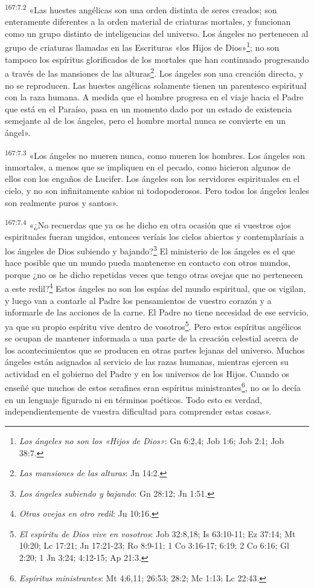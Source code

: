 \par 
\textsuperscript{167:7.2} «Las huestes angélicas son una orden distinta de seres creados; son enteramente diferentes a la orden material de criaturas mortales, y funcionan como un grupo distinto de inteligencias del universo. Los ángeles no pertenecen al grupo de criaturas llamadas en las Escrituras «los Hijos de Dios»\footnote{\textit{Los ángeles no son los «Hijos de Dios»}: Gn 6:2,4; Job 1:6; Job 2:1; Job 38:7.}; no son tampoco los espíritus glorificados de los mortales que han continuado progresando a través de las mansiones de las alturas\footnote{\textit{Las mansiones de las alturas}: Jn 14:2.}. Los ángeles son una creación directa, y no se reproducen. Las huestes angélicas solamente tienen un parentesco espiritual con la raza humana. A medida que el hombre progresa en el viaje hacia el Padre que está en el Paraíso, pasa en un momento dado por un estado de existencia semejante al de los ángeles, pero el hombre mortal nunca se convierte en un ángel».

\par 
\textsuperscript{167:7.3} «Los ángeles no mueren nunca, como mueren los hombres. Los ángeles son inmortales, a menos que se impliquen en el pecado, como hicieron algunos de ellos con los engaños de Lucifer. Los ángeles son los servidores espirituales en el cielo, y no son infinitamente sabios ni todopoderosos. Pero todos los ángeles leales son realmente puros y santos».

\par 
\textsuperscript{167:7.4} «¿No recuerdas que ya os he dicho en otra ocasión que si vuestros ojos espirituales fueran ungidos, entonces veríais los cielos abiertos y contemplaríais a los ángeles de Dios subiendo y bajando?\footnote{\textit{Los ángeles subiendo y bajando}: Gn 28:12; Jn 1:51.} El ministerio de los ángeles es el que hace posible que un mundo pueda mantenerse en contacto con otros mundos, porque ¿no os he dicho repetidas veces que tengo otras ovejas que no pertenecen a este redil?\footnote{\textit{Otras ovejas en otro redil}: Jn 10:16.} Estos ángeles no son los espías del mundo espiritual, que os vigilan, y luego van a contarle al Padre los pensamientos de vuestro corazón y a informarle de las acciones de la carne. El Padre no tiene necesidad de ese servicio, ya que su propio espíritu vive dentro de vosotros\footnote{\textit{El espíritu de Dios vive en vosotros}: Job 32:8,18; Is 63:10-11; Ez 37:14; Mt 10:20; Lc 17:21; Jn 17:21-23; Ro 8:9-11; 1 Co 3:16-17; 6:19; 2 Co 6:16; Gl 2:20; 1 Jn 3:24; 4:12-15; Ap 21:3.}. Pero estos espíritus angélicos se ocupan de mantener informada a una parte de la creación celestial acerca de los acontecimientos que se producen en otras partes lejanas del universo. Muchos ángeles están asignados al servicio de las razas humanas, mientras ejercen su actividad en el gobierno del Padre y en los universos de los Hijos. Cuando os enseñé que muchos de estos serafines eran espíritus ministrantes\footnote{\textit{Espíritus ministrantes}: Mt 4:6,11; 26:53; 28:2; Mc 1:13; Lc 22:43.}, no os lo decía en un lenguaje figurado ni en términos poéticos. Todo esto es verdad, independientemente de vuestra dificultad para comprender estas cosas».

